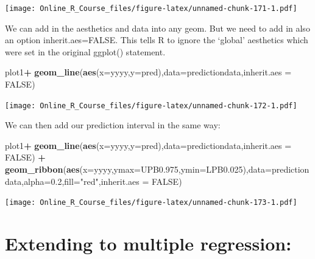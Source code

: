 \documentclass[]{book}
\newenvironment{Shaded}{\begin{snugshade}}{\end{snugshade}}
\newcommand{\DataTypeTok}[1]{\textcolor[rgb]{0.13,0.29,0.53}{#1}}
\newcommand{\FloatTok}[1]{\textcolor[rgb]{0.00,0.00,0.81}{#1}}
\newcommand{\KeywordTok}[1]{\textcolor[rgb]{0.13,0.29,0.53}{\textbf{#1}}}
\newcommand{\NormalTok}[1]{#1}
\newcommand{\OperatorTok}[1]{\textcolor[rgb]{0.81,0.36,0.00}{\textbf{#1}}}
\newcommand{\OtherTok}[1]{\textcolor[rgb]{0.56,0.35,0.01}{#1}}
\newcommand{\StringTok}[1]{\textcolor[rgb]{0.31,0.60,0.02}{#1}}
\begin{document}
\texttt{[image: Online\_R\_Course\_files/figure-latex/unnamed-chunk-171-1.pdf]}

We can add in the aesthetics and data into any geom. But we need to add in also an option inherit.aes=FALSE. This tells R to ignore the `global' aesthetics which were set in the original ggplot() statement.

\begin{Shaded}
\begin{Highlighting}[]
\NormalTok{plot1}\OperatorTok{+}
\StringTok{  }\KeywordTok{geom_line}\NormalTok{(}\KeywordTok{aes}\NormalTok{(}\DataTypeTok{x=}\NormalTok{yyyy,}\DataTypeTok{y=}\NormalTok{pred),}\DataTypeTok{data=}\NormalTok{predictiondata,}\DataTypeTok{inherit.aes =} \OtherTok{FALSE}\NormalTok{) }
\end{Highlighting}
\end{Shaded}

\texttt{[image: Online\_R\_Course\_files/figure-latex/unnamed-chunk-172-1.pdf]}

We can then add our prediction interval in the same way:

\begin{Shaded}
\begin{Highlighting}[]
\NormalTok{plot1}\OperatorTok{+}
\StringTok{  }\KeywordTok{geom_line}\NormalTok{(}\KeywordTok{aes}\NormalTok{(}\DataTypeTok{x=}\NormalTok{yyyy,}\DataTypeTok{y=}\NormalTok{pred),}\DataTypeTok{data=}\NormalTok{predictiondata,}\DataTypeTok{inherit.aes =} \OtherTok{FALSE}\NormalTok{) }\OperatorTok{+}
\StringTok{    }\KeywordTok{geom_ribbon}\NormalTok{(}\KeywordTok{aes}\NormalTok{(}\DataTypeTok{x=}\NormalTok{yyyy,}\DataTypeTok{ymax=}\NormalTok{UPB0}\FloatTok{.975}\NormalTok{,}\DataTypeTok{ymin=}\NormalTok{LPB0}\FloatTok{.025}\NormalTok{),}\DataTypeTok{data=}\NormalTok{predictiondata,}\DataTypeTok{alpha=}\FloatTok{0.2}\NormalTok{,}\DataTypeTok{fill=}\StringTok{"red"}\NormalTok{,}\DataTypeTok{inherit.aes =} \OtherTok{FALSE}\NormalTok{)}
\end{Highlighting}
\end{Shaded}

\texttt{[image: Online\_R\_Course\_files/figure-latex/unnamed-chunk-173-1.pdf]}

\hypertarget{extending-to-multiple-regression}{%
\section{Extending to multiple regression:}\label{extending-to-multiple-regression}}
\end{document}
